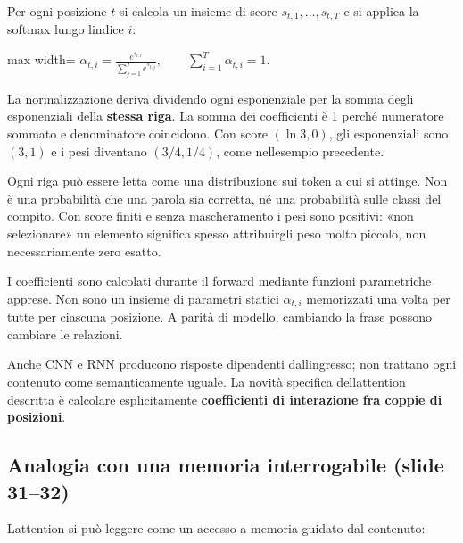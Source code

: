 \documentclass[11pt,a4paper,oneside,openany]{book}
\begin{document}
Per ogni posizione \(t\) si calcola un insieme di score \(s_{t,1},\ldots,s_{t,T}\) e si applica la softmax lungo l\textquotesingle indice \(i\):

\begin{center}
\begin{adjustbox}{max width=\linewidth}
$\displaystyle \boxed{\alpha_{t,i}=\frac{e^{s_{t,i}}}{\sum_{j=1}^{T}e^{s_{t,j}}},\qquad\sum_{i=1}^{T}\alpha_{t,i}=1.}$
\end{adjustbox}
\end{center}

La normalizzazione deriva dividendo ogni esponenziale per la somma degli esponenziali della \textbf{stessa riga}. La somma dei coefficienti è 1 perché numeratore sommato e denominatore coincidono. Con score \((\ln3,0)\), gli esponenziali sono \((3,1)\) e i pesi diventano \((3/4,1/4)\), come nell\textquotesingle esempio precedente.

Ogni riga può essere letta come una distribuzione sui token a cui si attinge. Non è una probabilità che una parola sia corretta, né una probabilità sulle classi del compito. Con score finiti e senza mascheramento i pesi sono positivi: «non selezionare» un elemento significa spesso attribuirgli peso molto piccolo, non necessariamente zero esatto.

I coefficienti sono calcolati durante il forward mediante funzioni parametriche apprese. Non sono un insieme di parametri statici \(\alpha_{t,i}\) memorizzati una volta per tutte per ciascuna posizione. A parità di modello, cambiando la frase possono cambiare le relazioni.

Anche CNN e RNN producono risposte dipendenti dall\textquotesingle ingresso; non trattano ogni contenuto come semanticamente uguale. La novità specifica dell\textquotesingle attention descritta è calcolare esplicitamente \textbf{coefficienti di interazione fra coppie di posizioni}.

\subsection{Analogia con una memoria interrogabile (slide 31--32)}\label{f04-r517}

L\textquotesingle attention si può leggere come un accesso a memoria guidato dal contenuto:
\end{document}
